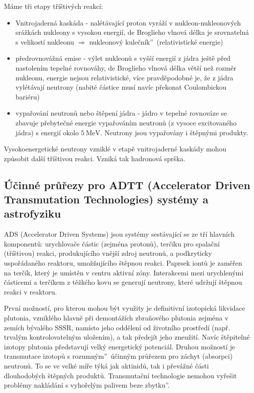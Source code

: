 \documentclass[../../main.tex]{subfiles}
\begin{document}
Máme tři etapy tříštivých reakcí:
\begin{itemize}
	\item Vnitrojaderná kaskáda - nalétávající proton vyráží v nukleon-nukleonových srážkách nukleony s vysokou energií, de Broglieho vlnová délka je srovnatelná s velikostí nukleonu $\Rightarrow$ \quotedblbase nukleonový kulečník\textquotedblright ~(relativistické energie)
	\item předrovnovážná emise - výlet nukleonů s vyšší energií z jádra ještě před nastolením tepelné rovnováhy, de Broglieho vlnová délka větší než rozměr nukleonu, energie nejsou relativistické, více pravděpodobné je, že z jádra vylétávají neutrony (nabité částice musí navíc překonat Coulombickou bariéru)
	\item vypařování neutronů nebo štěpení jádra - jádro v tepelné rovnováze se zbavuje přebytečné energie vypařováním neutronů (z vysoce excitovaného jádra) s energií okolo $5 ~\mathrm{MeV}$. Neutrony jsou vypařovány i štěpnými produkty. 
\end{itemize}

Vysokoenergetické neutrony vzniklé v etapě vnitrojaderné kaskády mohou způsobit další tříštivou reakci. Vzniká tak hadronová sprška. 

\subsection{Účinné průřezy pro ADTT (Accelerator Driven Transmutation Technologies) systémy a astrofyziku}

ADS  (Accelerator Driven Systems) jsou systémy sestávající se ze tří hlavních komponentů: urychlovače částic (zejména protonů), terčíku pro spalační (tříštivou) reakci, produkujícího vnější zdroj neutronů, a podkryticky uspořádaného reaktoru, umožňujícího štěpnou reakci. Paprsek iontů je zaměřen na terčík, který je umístěn v centru aktivní zóny. Interakcemi mezi urychlenými částicemi a terčíkem z těžkého kovu se generují neutrony, které udržují štěpnou reakci v reaktoru.

První možností, pro kterou mohou být využity je definitivní izotopická likvidace plutonia, vzniklého hlavně při demontážích zbraňového plutonia zejména v zemích bývalého SSSR, namísto jeho oddělení od životního prostředí (např. trvalým kontrolovatelným uložením), a tak předejít jeho zneužití. Navíc štěpitelné izotopy plutonia představují velký energetický potenciál.  Druhou možností je transmutace izotopů s \quotedblbase rozumným\textquotedblright ~účinným průřezem pro záchyt (absorpci) neutronů. To se ve velké míře týká jak aktinidů, tak i převážné části dlouhodobých štěpných produktů. Transmutační technologie nemohou vyřešit problémy nakládání s vyhořelým palivem \quotedblbase beze zbytku\textquotedblright. 
\end{document}
